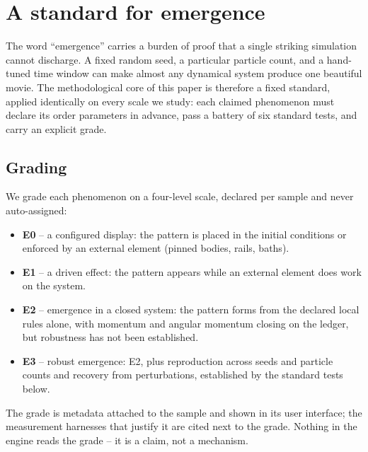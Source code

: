 \documentclass[aps,reprint,amsmath,amssymb,nofootinbib,superscriptaddress,floatfix]{revtex4-2}
\begin{document}
\section{A standard for emergence}
\label{sec:standard}

The word ``emergence'' carries a burden of proof that a single striking
simulation cannot discharge. A fixed random seed, a particular particle
count, and a hand-tuned time window can make almost any dynamical system
produce one beautiful movie. The methodological core of this paper is
therefore a fixed standard, applied identically on every scale we study:
each claimed phenomenon must declare its order parameters in advance,
pass a battery of six standard tests, and carry an explicit grade.

\subsection{Grading}

We grade each phenomenon on a four-level scale, declared per sample and
never auto-assigned:

\begin{itemize}
\item \textbf{E0} -- a configured display: the pattern is placed in the
  initial conditions or enforced by an external element (pinned bodies,
  rails, baths).
\item \textbf{E1} -- a driven effect: the pattern appears while an
  external element does work on the system.
\item \textbf{E2} -- emergence in a closed system: the pattern forms from
  the declared local rules alone, with momentum and angular momentum
  closing on the ledger, but robustness has not been established.
\item \textbf{E3} -- robust emergence: E2, plus reproduction across seeds
  and particle counts and recovery from perturbations, established by the
  standard tests below.
\end{itemize}

The grade is metadata attached to the sample and shown in its user
interface; the measurement harnesses that justify it are cited next to
the grade. Nothing in the engine reads the grade -- it is a claim, not a
mechanism.
\end{document}
